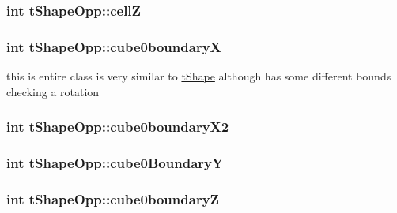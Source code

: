 \hypertarget{classt_shape_opp_a2e5cae84204ba6ffa6ac65adefd53655}{
\subsubsection[{cell\-Z}]{\setlength{\rightskip}{0pt plus 5cm}int t\-Shape\-Opp\-::cell\-Z}}\label{classt_shape_opp_a2e5cae84204ba6ffa6ac65adefd53655}
\hypertarget{classt_shape_opp_a2862f3eed71b35986b016c90c4b05789}{
\subsubsection[{cube0boundary\-X}]{\setlength{\rightskip}{0pt plus 5cm}int t\-Shape\-Opp\-::cube0boundary\-X}}\label{classt_shape_opp_a2862f3eed71b35986b016c90c4b05789}
this is entire class is very similar to \hyperlink{classt_shape}{t\-Shape} although has some different bounds checking a rotation \hypertarget{classt_shape_opp_aa32382ad78df3bb4bc348615d0ddf861}{
\subsubsection[{cube0boundary\-X2}]{\setlength{\rightskip}{0pt plus 5cm}int t\-Shape\-Opp\-::cube0boundary\-X2}}\label{classt_shape_opp_aa32382ad78df3bb4bc348615d0ddf861}
\hypertarget{classt_shape_opp_aa09d7e2bf091902223eca13949282a3b}{
\subsubsection[{cube0\-Boundary\-Y}]{\setlength{\rightskip}{0pt plus 5cm}int t\-Shape\-Opp\-::cube0\-Boundary\-Y}}\label{classt_shape_opp_aa09d7e2bf091902223eca13949282a3b}
\hypertarget{classt_shape_opp_ab87445197fb1652f5af61c8427bdfdf1}{
\subsubsection[{cube0boundary\-Z}]{\setlength{\rightskip}{0pt plus 5cm}int t\-Shape\-Opp\-::cube0boundary\-Z}}\label{classt_shape_opp_ab87445197fb1652f5af61c8427bdfdf1}
